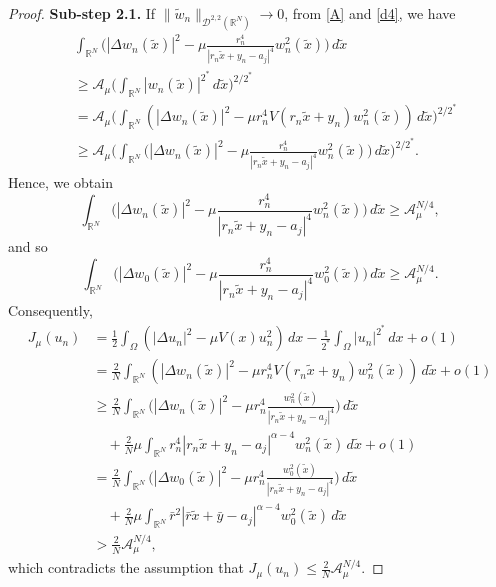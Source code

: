 \documentclass[reqno]{amsart}
\begin{document}
\begin{proof}
 \textbf{Sub-step 2.1.}
  If \(\|\tilde{w}_n\|_{ \mathcal{D}^{2,2}(\mathbb{R}^N)}\to 0\), from \eqref{A} and 
 \eqref{d4}, we have
 \begin{align*}
&\int_{\mathbb{R}^N}\Big( |\Delta w_n(\tilde{x})|^2-\mu \frac{r_n^4}{\left| 
r_{n}\tilde{x}+y_n-a_j\right| ^4}w_n^2(\tilde{x})\Big)\,d\tilde{x}\\
 &\geq \mathcal{A}_{\mu} \Big( \int _{\mathbb{R}^N}|w_n(\tilde{x})|^{2^*}
  \,d\tilde{x}\Big) ^{2/2^*}\\
 &=\mathcal{A}_{\mu} \Big(\int_{\mathbb{R}^N}\left( |\Delta w_n(\tilde{x})|^2
  -\mu r_n^4 V(r_n\tilde{x}+y_n)w_n^2(\tilde{x})\right) \,d\tilde{x}\Big)^{2/2^*}\\
 &\geq \mathcal{A}_{\mu} \Big(\int_{\mathbb{R}^N}\Big( |\Delta w_n(\tilde{x})|^2
 -\mu \frac{r_n^4}{\left| r_{n}\tilde{x}+y_n-a_j\right| ^4}w_n^2(\tilde{x})\Big) 
 \,d\tilde{x}\Big)^{2/2^*}.
 \end{align*}
Hence, we obtain
 \[
 \int_{\mathbb{R}^N}\Big( |\Delta w_n(\tilde{x})|^2-\mu \frac{r_n^4}
 {\left| r_{n}\tilde{x}+y_n-a_j\right| ^4}w_n^2(\tilde{x})\Big)\,d\tilde{x}
 \geq \mathcal{A}_{\mu}^{N/4},
 \]
and so
 \[
 \int_{\mathbb{R}^N}\Big( |\Delta w_0(\tilde{x})|^2-\mu \frac{r_n^4}{|r_n
 \tilde{x}+y_n-a_j|^4}w_0^2(\tilde{x})\Big)\,d\tilde{x}
 \geq \mathcal{A}_{\mu}^{N/4}.
 \]
Consequently, 
 \begin{align*}
 J_{\mu}(u_n)
 &=\frac{1}{2}\int_{\Omega}(|\Delta u_n|^2-\mu V(x)u_n^2)\,dx
  -\frac{1}{2^*} \int_{\Omega} |u_n|^{2^*}\,dx+o(1)\\
 &=\frac{2}{N}\int_{\mathbb{R}^N}\left( |\Delta w_n(\tilde{x})|^2
  -\mu r_n^4 V(r_n\tilde{x}+y_n)w_n^2(\tilde{x})\right)\,d\tilde{x}+o(1)\\
 &\geq \frac{2}{N}\int_{\mathbb{R}^N}
 \Big( |\Delta w_n(\tilde{x})|^2-\mu r_n^4\frac{w_n^2(\tilde{x})}
 {|r_n \tilde{x}+y_n-a_j|^4}\Big)\,d\tilde{x}\\
 &\quad  +\frac{2}{N} \mu \int_{\mathbb{R}^N}r_n^4|r_n \tilde{x}+y_n-a_j
  |^{\alpha-4}w_n^2(\tilde{x})\,d\tilde{x}+o(1)\\
 &=\frac{2}{N}\int_{\mathbb{R}^N}\Big( |\Delta w_0(\tilde{x})|^2
  -\mu r_n^4\frac{w_0^2(\tilde{x})}{|r_n \tilde{x}+y_n-a_j|^4}\Big)\,d\tilde{x} \\
 &\quad +\frac{2}{N}\mu \int_{\mathbb{R}^N}\bar{r}^2|\bar{r}\tilde{x}+\bar{y}
 -a_j|^{\alpha-4}w_0^2(\tilde{x})\,d\tilde{x}\\
 &> \frac{2}{N}\mathcal{A}_{\mu}^{N/4},
 \end{align*}
which contradicts the assumption that 
\(J_{\mu}(u_n)\leq \frac{2}{N}\mathcal{A}_{\mu}^{N/4}\).
\smallskip


\end{proof}
\end{document}
